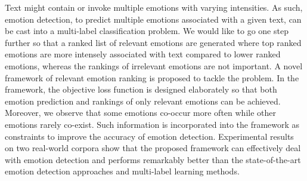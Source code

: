 Text might contain or invoke multiple emotions with varying intensities. As such, emotion detection, to predict multiple emotions associated with a given text, can be cast into a multi-label classification problem. We would like to go one step further so that a ranked list of relevant emotions are generated where top ranked emotions are more intensely associated with text compared to lower ranked emotions, whereas the rankings of irrelevant emotions are not important. A novel framework of relevant emotion ranking is proposed to tackle the problem. In the framework, the objective loss function is designed elaborately so that both emotion prediction and rankings of only relevant emotions can be achieved. Moreover, we observe that some emotions co-occur more often while other emotions rarely co-exist. Such information is incorporated into the framework as constraints to improve the accuracy of emotion detection. Experimental results on two real-world corpora show that the proposed framework can effectively deal with emotion detection and performs remarkably better than the state-of-the-art emotion detection approaches and multi-label learning methods.
